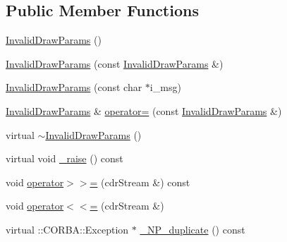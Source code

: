 \subsection*{Public Member Functions}
\begin{DoxyCompactItemize}
\item 
\hyperlink{class_petit_prince_service_1_1_invalid_draw_params_ada9c3a277688d5c7e36f59a59697dec2}{Invalid\+Draw\+Params} ()
\item 
\hyperlink{class_petit_prince_service_1_1_invalid_draw_params_ab8e4567f0909cc24064da6227a36c6b3}{Invalid\+Draw\+Params} (const \hyperlink{class_petit_prince_service_1_1_invalid_draw_params}{Invalid\+Draw\+Params} \&)
\item 
\hyperlink{class_petit_prince_service_1_1_invalid_draw_params_a8e422ba4cb343620321e31c1e83d5845}{Invalid\+Draw\+Params} (const char $\ast$i\+\_\+msg)
\item 
\hyperlink{class_petit_prince_service_1_1_invalid_draw_params}{Invalid\+Draw\+Params} \& \hyperlink{class_petit_prince_service_1_1_invalid_draw_params_a04fe5e64e5b7dcc9595b51a3df80a9bb}{operator=} (const \hyperlink{class_petit_prince_service_1_1_invalid_draw_params}{Invalid\+Draw\+Params} \&)
\item 
virtual \hyperlink{class_petit_prince_service_1_1_invalid_draw_params_a3488986314279cc4f5d4f96bad9ecbb0}{$\sim$\+Invalid\+Draw\+Params} ()
\item 
virtual void \hyperlink{class_petit_prince_service_1_1_invalid_draw_params_a6ba6781a38912e9509b28bd7acb14693}{\+\_\+raise} () const 
\item 
void \hyperlink{class_petit_prince_service_1_1_invalid_draw_params_a285adf31166b13ad5fe5587b903b135c}{operator$>$$>$=} (cdr\+Stream \&) const 
\item 
void \hyperlink{class_petit_prince_service_1_1_invalid_draw_params_a064cd2058013b1af2385a932d73849bd}{operator$<$$<$=} (cdr\+Stream \&)
\item 
virtual \+::C\+O\+R\+B\+A\+::\+Exception $\ast$ \hyperlink{class_petit_prince_service_1_1_invalid_draw_params_a6c2845831c714db13d15ee27bfcbf4e2}{\+\_\+\+N\+P\+\_\+duplicate} () const 
\end{DoxyCompactItemize}
